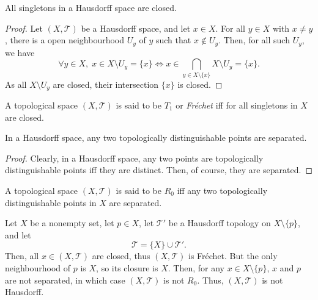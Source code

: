 \begin{proposition}
	\label{prop: T2 implies T1}
	All singletons in a Hausdorff space are closed.
	
	\begin{proof}
		Let $(X, \mathcal T)$ be a Hausdorff space, and let $x \in X$. For all $y \in X$ with $x \ne y$, there is a open neighbourhood $U_y$ of $y$ such that $x \notin U_y$. Then, for all such $U_y$, we have
		$$
		\forall y \in X, \; x \in X \setminus U_y = \{x\} \iff x \in \bigcap_{y \in X \setminus \{x\}} X \setminus U_y  = \{x\}.
		$$
		As all $X \setminus U_y$ are closed, their intersection $\{x\}$ is closed.
	\end{proof}
\end{proposition}


\begin{definition}
	\label{def: T_1 spaces}
	A topological space $(X, \mathcal T)$ is said to be $T_1$ or \textit{Fr\'echet} iff for all singletons in $X$ are closed.
\end{definition}


\begin{proposition}
	\label{prop: T2 implies R0}
	In a Hausdorff space, any two topologically distinguishable points are separated.
	
	\begin{proof}
		Clearly, in a Hausdorff space, any two points are topologically distinguishable points iff they are distinct. Then, of course, they are separated.
	\end{proof}
\end{proposition}


\begin{definition}
	[$R_0$ spaces]
	\label{def: R_0 spaces}
	A topological space $(X, \mathcal T)$ is said to be $R_0$ iff any two topologically distinguishable points in $X$ are separated.
\end{definition}


\begin{example}
	\label{eg: T_1 but not T_2}
	Let $X$ be a nonempty set, let $p \in X$, let $\mathcal T'$ be a Hausdorff topology on $X \setminus \{p\}$, and let
	$$
	\mathcal T = \{X\} \cup \mathcal T'.
	$$
	Then, all $x \in (X, \mathcal T)$ are closed, thus $(X, \mathcal T)$ is Fr\'echet. But the only neighbourhood of $p$ is $X$, so its closure is $X$. Then, for any $x \in X \setminus \{p\}$, $x$ and $p$ are not separated, in which case $(X, \mathcal T)$ is not $R_0$. Thus, $(X, \mathcal T)$ is not Hausdorff.
\end{example}


